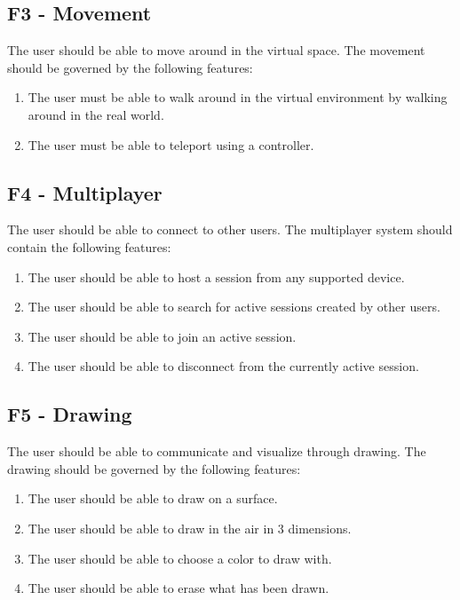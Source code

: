         \subsection{F3 - Movement}
        The user should be able to move around in the virtual space. The movement should be governed by the following features:
        \begin{enumerate}
            \item The user must be able to walk around in the virtual environment by walking around in the real world.
            \item The user must be able to teleport using a controller.
        \end{enumerate}
        
        \subsection{F4 - Multiplayer}
        The user should be able to connect to other users. The multiplayer system should contain the following features:
        \begin{enumerate}
            \item The user should be able to host a session from any supported device.
            \item The user should be able to search for active sessions created by other users.
            \item The user should be able to join an active session.
            \item The user should be able to disconnect from the currently active session.
        \end{enumerate}
        
        \subsection{F5 - Drawing}
        The user should be able to communicate and visualize through drawing. The drawing should be governed by the following features:
        \begin{enumerate}
            \item The user should be able to draw on a surface.
            \item The user should be able to draw in the air in 3 dimensions.
            \item The user should be able to choose a color to draw with.
            \item The user should be able to erase what has been drawn.
        \end{enumerate}
        
